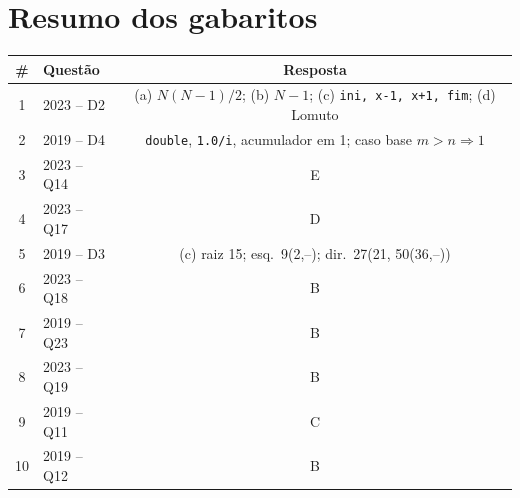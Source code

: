 \documentclass[11pt,a4paper]{article}
\begin{document}
\section*{Resumo dos gabaritos}
\begin{center}
\begin{tabular}{@{}clc@{}}
\toprule
\# & Questão & Resposta\\
\midrule
1  & 2023 -- D2  & (a) $N(N-1)/2$; (b) $N-1$; (c) \texttt{ini, x-1, x+1, fim}; (d) Lomuto\\
2  & 2019 -- D4  & \texttt{double}, \texttt{1.0/i}, acumulador em 1; caso base $m>n \Rightarrow 1$\\
3  & 2023 -- Q14 & E\\
4  & 2023 -- Q17 & D\\
5  & 2019 -- D3  & (c) raiz 15; esq.\ 9(2,--); dir.\ 27(21, 50(36,--))\\
6  & 2023 -- Q18 & B\\
7  & 2019 -- Q23 & B\\
8  & 2023 -- Q19 & B\\
9  & 2019 -- Q11 & C\\
10 & 2019 -- Q12 & B\\
\bottomrule
\end{tabular}
\end{center}
\end{document}
